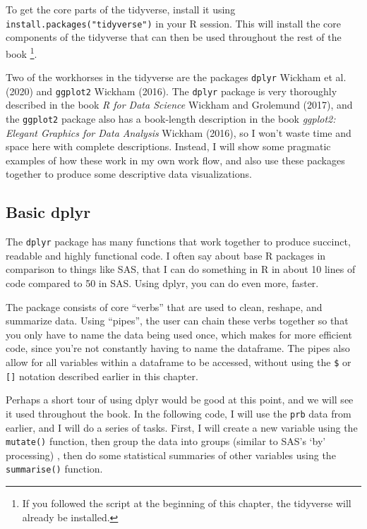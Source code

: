 \documentclass[
  letterpaper,
  DIV=11,
  numbers=noendperiod]{scrreprt}
\begin{document}
To get the core parts of the tidyverse, install it using
\texttt{install.packages("tidyverse")} in your R session. This will
install the core components of the tidyverse that can then be used
throughout the rest of the book \footnote{If you followed the script at
  the beginning of this chapter, the tidyverse will already be
  installed.}.

Two of the workhorses in the tidyverse are the packages \texttt{dplyr}
Wickham et al. (2020) and \texttt{ggplot2} Wickham (2016). The
\texttt{dplyr} package is very thoroughly described in the book \emph{R
for Data Science} Wickham and Grolemund (2017), and the \texttt{ggplot2}
package also has a book-length description in the book \emph{ggplot2:
Elegant Graphics for Data Analysis} Wickham (2016), so I won't waste
time and space here with complete descriptions. Instead, I will show
some pragmatic examples of how these work in my own work flow, and also
use these packages together to produce some descriptive data
visualizations.

\hypertarget{basic-dplyr}{%
\subsection{Basic dplyr}\label{basic-dplyr}}

The \texttt{dplyr} package has many functions that work together to
produce succinct, readable and highly functional code. I often say about
base R packages in comparison to things like SAS, that I can do
something in R in about 10 lines of code compared to 50 in SAS. Using
dplyr, you can do even more, faster.

The package consists of core ``verbs'' that are used to clean, reshape,
and summarize data. Using ``pipes'', the user can chain these verbs
together so that you only have to name the data being used once, which
makes for more efficient code, since you're not constantly having to
name the dataframe. The pipes also allow for all variables within a
dataframe to be accessed, without using the \texttt{\$} or
\texttt{{[}{]}} notation described earlier in this chapter.

Perhaps a short tour of using dplyr would be good at this point, and we
will see it used throughout the book. In the following code, I will use
the \texttt{prb} data from earlier, and I will do a series of tasks.
First, I will create a new variable using the \texttt{mutate()}
function, then group the data into groups (similar to SAS's `by'
processing) , then do some statistical summaries of other variables
using the \texttt{summarise()} function.
\end{document}
